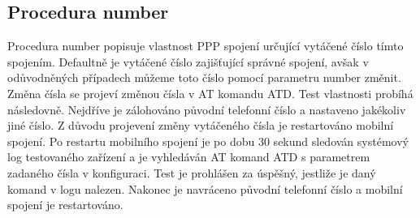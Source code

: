 \subsection{Procedura number}
Procedura number popisuje vlastnost PPP spojení určující vytáčené číslo tímto spojením. Defaultně je vytáčené číslo zajišťující správné spojení, avšak v odůvodněných případech můžeme toto číslo pomocí parametru number změnit. Změna čísla se projeví změnou čísla v AT komandu ATD. Test vlastnosti probíhá následovně. Nejdříve je zálohováno původní telefonní číslo a nastaveno jakékoliv jiné číslo. Z důvodu projevení změny vytáčeného čísla je restartováno mobilní spojení. Po restartu mobilního spojení je po dobu 30 sekund sledován systémový log testovaného zařízení a je vyhledáván AT komand ATD s parametrem zadaného čísla v konfiguraci. Test je prohlášen za úspěšný, jestliže je daný komand v logu nalezen. Nakonec je navráceno původní telefonní číslo a mobilní spojení je restartováno.

\endinput
